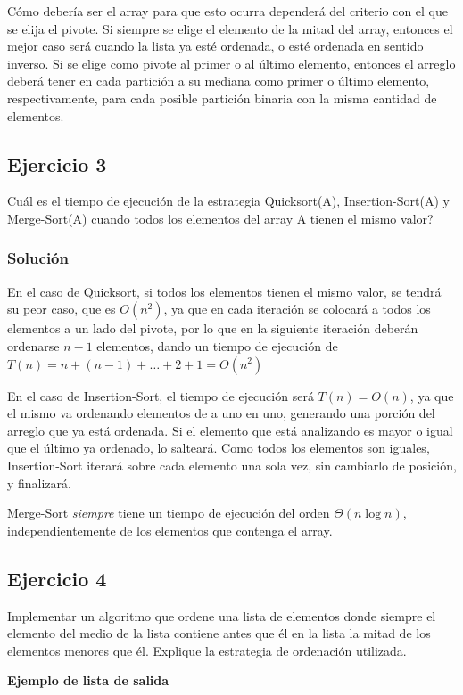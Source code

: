 \documentclass{article}
\begin{document}
Cómo debería ser el array para que esto ocurra dependerá del criterio con el que se elija el pivote. Si siempre se elige el elemento de la mitad del array, entonces el mejor caso será cuando la lista ya esté ordenada, o esté ordenada en sentido inverso. Si se elige como pivote al primer o al último elemento, entonces el arreglo deberá tener en cada partición a su mediana como primer o último elemento, respectivamente, para cada posible partición binaria con la misma cantidad de elementos.


\subsection*{Ejercicio 3}
Cuál es el tiempo de ejecución de la estrategia Quicksort(A), Insertion-Sort(A) y Merge-Sort(A) cuando todos los elementos del array A tienen el mismo valor?

\subsubsection*{Solución}
En el caso de Quicksort, si todos los elementos tienen el mismo valor, se tendrá su peor caso, que es $O(n^2)$, ya que en cada iteración se colocará a todos los elementos a un lado del pivote, por lo que en la siguiente iteración deberán ordenarse $n-1$ elementos, dando un tiempo de ejecución de $T(n) = n + (n-1) + \dots + 2 + 1 = O(n^2)$

En el caso de Insertion-Sort, el tiempo de ejecución será $T(n) = O(n)$, ya que el mismo va ordenando elementos de a uno en uno, generando una porción del arreglo que ya está ordenada. Si el elemento que está analizando es mayor o igual que el último ya ordenado, lo salteará. Como todos los elementos son iguales, Insertion-Sort iterará sobre cada elemento una sola vez, sin cambiarlo de posición, y finalizará.

Merge-Sort {\em siempre} tiene un tiempo de ejecución del orden $\Theta (n \log n)$, independientemente de los elementos que contenga el array.


\subsection*{Ejercicio 4}
Implementar un algoritmo que ordene una lista de elementos donde siempre el elemento del medio de la lista contiene antes que él en la lista la mitad de los elementos menores que él. Explique la estrategia de ordenación utilizada.

\textbf{Ejemplo de lista de salida}
\end{document}
